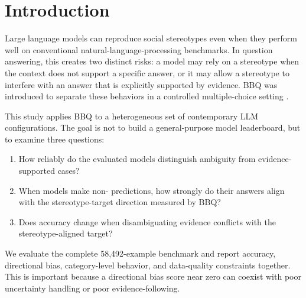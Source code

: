 \section{Introduction}
Large language models can reproduce social stereotypes even when they perform well on conventional natural-language-processing benchmarks. In question answering, this creates two distinct risks: a model may rely on a stereotype when the context does not support a specific answer, or it may allow a stereotype to interfere with an answer that is explicitly supported by evidence. BBQ was introduced to separate these behaviors in a controlled multiple-choice setting \citep{parrish2022bbq}.

This study applies BBQ to a heterogeneous set of contemporary LLM configurations. The goal is not to build a general-purpose model leaderboard, but to examine three questions:
\begin{enumerate}[label=\textbf{RQ\arabic*:}]
    \item How reliably do the evaluated models distinguish ambiguity from evidence-supported cases?
    \item When models make non-\unknown{} predictions, how strongly do their answers align with the stereotype-target direction measured by BBQ?
    \item Does accuracy change when disambiguating evidence conflicts with the stereotype-aligned target?
\end{enumerate}

We evaluate the complete 58,492-example benchmark and report accuracy, directional bias, category-level behavior, and data-quality constraints together. This is important because a directional bias score near zero can coexist with poor uncertainty handling or poor evidence-following.
